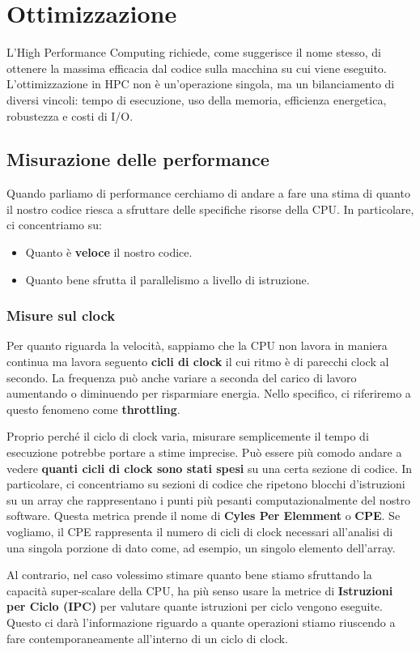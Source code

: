 \chapter{Ottimizzazione}
L’High Performance Computing richiede, come suggerisce il nome stesso, di ottenere la massima efficacia dal codice sulla macchina su cui viene eseguito. L’ottimizzazione in HPC non è un’operazione singola, ma un bilanciamento di diversi vincoli: tempo di esecuzione, uso della memoria, efficienza energetica, robustezza e costi di I/O.
\section{Misurazione delle performance}
Quando parliamo di performance cerchiamo di andare a fare una stima di quanto il nostro codice riesca a sfruttare delle specifiche risorse della CPU. In particolare, ci concentriamo su:
\begin{itemize}
    \item Quanto è \textbf{veloce} il nostro codice.
    \item Quanto bene sfrutta il parallelismo a livello di istruzione.
\end{itemize}
\subsection{Misure sul clock}
Per quanto riguarda la velocità, sappiamo che la CPU non lavora in maniera continua ma lavora seguento \textbf{cicli di clock} il cui ritmo è di parecchi clock al secondo. La frequenza può anche variare a seconda del carico di lavoro aumentando o diminuendo per risparmiare energia. Nello specifico, ci riferiremo a questo fenomeno come \textbf{throttling}.

Proprio perché il ciclo di clock varia, misurare semplicemente il tempo di esecuzione potrebbe portare a stime imprecise. Può essere più comodo andare a vedere \textbf{quanti cicli di clock sono stati spesi} su una certa sezione di codice. In particolare, ci concentriamo su sezioni di codice che ripetono blocchi d'istruzioni su un array che rappresentano i punti più pesanti computazionalmente del nostro software. Questa metrica prende il nome di \textbf{Cyles Per Elemment} o \textbf{CPE}. Se vogliamo, il CPE rappresenta il numero di cicli di clock necessari all'analisi di una singola porzione di dato come, ad esempio, un singolo elemento dell'array. 

Al contrario, nel caso volessimo stimare quanto bene stiamo sfruttando la capacità super-scalare della CPU, ha più senso usare la metrice di \textbf{Istruzioni per Ciclo (IPC)} per valutare quante istruzioni per ciclo vengono eseguite. Questo ci darà l'informazione riguardo a quante operazioni stiamo riuscendo a fare contemporaneamente all'interno di un ciclo di clock.
